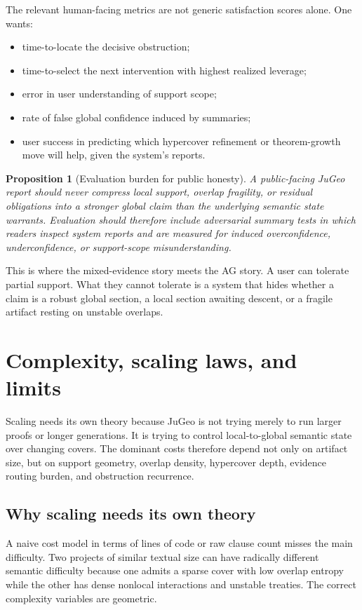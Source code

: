 \documentclass[11pt]{report}
\newtheorem{proposition}[definition]{Proposition}
\begin{document}
The relevant human-facing metrics are not generic satisfaction scores alone. One wants:
\begin{itemize}
\item time-to-locate the decisive obstruction;
\item time-to-select the next intervention with highest realized leverage;
\item error in user understanding of support scope;
\item rate of false global confidence induced by summaries;
\item user success in predicting which hypercover refinement or theorem-growth move will help, given the system's reports.
\end{itemize}

\begin{proposition}[Evaluation burden for public honesty]
A public-facing JuGeo report should never compress local support, overlap fragility, or residual obligations into a stronger global claim than the underlying semantic state warrants. Evaluation should therefore include adversarial summary tests in which readers inspect system reports and are measured for induced overconfidence, underconfidence, or support-scope misunderstanding.
\end{proposition}

This is where the mixed-evidence story meets the AG story. A user can tolerate partial support. What they cannot tolerate is a system that hides whether a claim is a robust global section, a local section awaiting descent, or a fragile artifact resting on unstable overlaps.

\chapter{Complexity, scaling laws, and limits}
Scaling needs its own theory because JuGeo is not trying merely to run larger proofs or longer generations. It is trying to control local-to-global semantic state over changing covers. The dominant costs therefore depend not only on artifact size, but on support geometry, overlap density, hypercover depth, evidence routing burden, and obstruction recurrence.

\section{Why scaling needs its own theory}
A naive cost model in terms of lines of code or raw clause count misses the main difficulty. Two projects of similar textual size can have radically different semantic difficulty because one admits a sparse cover with low overlap entropy while the other has dense nonlocal interactions and unstable treaties. The correct complexity variables are geometric.
\end{document}
